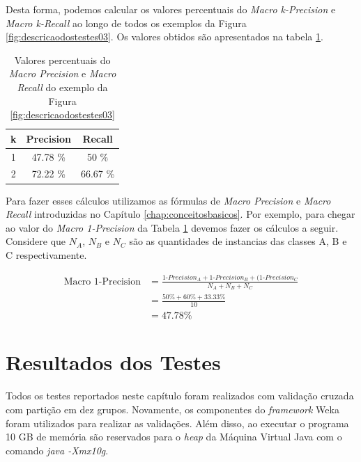 {Desta forma, podemos calcular os valores percentuais do \textit{Macro k-Precision} e \textit{Macro k-Recall} ao longo de todos os exemplos da Figura \ref{fig:descricaodostestes03}.
Os valores obtidos são apresentados na tabela \ref{tab:valores_macro}.

\begin{table}[h!]
  \begin{center}
    \begin{tabular}{ccc}
      \hline
      \textbf{k} & \textbf{Precision} & \textbf{Recall} \\
      \hline

1	&	47.78 \%	&	50 \%	\\
2	&	72.22 \%	&	66.67 \%	\\

      \hline
    \end{tabular}
    \caption{Valores percentuais do \textit{Macro Precision} e \textit{Macro Recall} do exemplo da Figura \ref{fig:descricaodostestes03}}
    \label{tab:valores_macro}
  \end{center}
\end{table}

Para fazer esses cálculos utilizamos as fórmulas de \textit{Macro Precision} e \textit{Macro Recall} introduzidas no Capítulo \ref{chap:conceitosbasicos}.
Por exemplo, para chegar ao valor do \textit{Macro 1-Precision} da Tabela \ref{tab:valores_macro} devemos fazer os cálculos a seguir.
Considere que $N_A$, $N_B$ e $N_C$ são as quantidades de instancias das classes A, B e C respectivamente.

\begin{align*}
\text{Macro 1-Precision} &= \frac{\text{1-$Precision_A$}+\text{1-$Precision_B$}+(\text{1-$Precision_C$}}{N_A+N_B+N_C} \\
&= \frac{50\%+60\%+33.33\%}{10} \\
&= 47.78\%
\end{align*}

\section{Resultados dos Testes}

Todos os testes reportados neste capítulo foram realizados com validação cruzada com partição em dez grupos.
Novamente, os componentes do \textit{framework} Weka foram utilizados para realizar as validações.
Além disso, ao executar o programa 10 GB de memória são reservados para o \textit{heap} da Máquina Virtual Java com o comando \textit{java -Xmx10g}.

}
